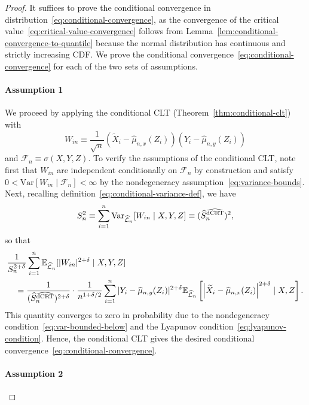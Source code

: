 \documentclass[aos]{imsart}
\theoremstyle{definition}
\theoremstyle{remark}
\newcommand{\E}{\mathbb E}								%
\newcommand{\V}{\mathrm{Var}}							%
\newcommand{\srx}{X}									%
\newcommand{\srz}{Z}									%
\newcommand{\srxk}{\widetilde X}						%
\newcommand{\sry}{Y}									%
\newcommand{\lawhat}{\widehat{\mathcal L}}				%
\newcommand{\dCRThat}{\widehat{\textnormal{dCRT}}}		%
\begin{document}
\begin{proof}

It suffices to prove the conditional convergence in distribution~\eqref{eq:conditional-convergence}, as the convergence of the critical value~\eqref{eq:critical-value-convergence} follows from Lemma~\ref{lem:conditional-convergence-to-quantile} because the normal distribution has continuous and strictly increasing CDF. We prove the conditional convergence~\eqref{eq:conditional-convergence} for each of the two sets of assumptions.

\paragraph*{Assumption 1}

We proceed by applying the conditional CLT (Theorem~\ref{thm:conditional-clt}) with 
\begin{equation}
W_{in} \equiv \frac{1}{\sqrt{n}}(\srxk_i - \widehat \mu_{n,x}(\srz_i))(\sry_i - \widehat \mu_{n,y}(\srz_i))
\end{equation}
and $\mathcal F_n \equiv \sigma(\srx, \sry, \srz)$. To verify the assumptions of the conditional CLT, note first that $W_{in}$ are independent conditionally on $\mathcal F_n$ by construction and satisfy $0 < \V[W_{in} \mid \mathcal F_n] < \infty$ by the nondegeneracy assumption~\eqref{eq:variance-bounds}. Next, recalling definition~\eqref{eq:conditional-variance-def}, we have
\begin{equation*}
S^2_n \equiv \sum_{i = 1}^n \V_{\lawhat_n}[W_{in}\mid \srx,\sry,\srz] \equiv (\widehat S_n^{\dCRThat})^2,
\end{equation*}
so that
\begin{align*}
		&\frac{1}{S_n^{2+\delta}} \sum_{i = 1}^n \E_{\lawhat_n}[|W_{in}|^{2+\delta} \mid \srx,\sry,\srz] \\
		&\quad= \frac{1}{(\widehat S_n^{\dCRThat})^{2+\delta}} \cdot \frac{1}{n^{1+\delta/2}} \sum_{i=1}^n |\sry_i-\widehat\mu_{n,y}(\srz_i)|^{2+\delta}\E_{\lawhat_n}\left[\left|\srxk_i-\widehat\mu_{n,x}(\srz_i)\right|^{2+\delta}\mid \srx,\srz\right].
\end{align*}
This quantity converges to zero in probability due to the nondegeneracy condition~\eqref{eq:var-bounded-below} and the Lyapunov condition~\eqref{eq:lyapunov-condition}. Hence, the conditional CLT gives the desired conditional convergence~\eqref{eq:conditional-convergence}.
 
 \paragraph*{Assumption 2}


\end{proof}
\end{document}
